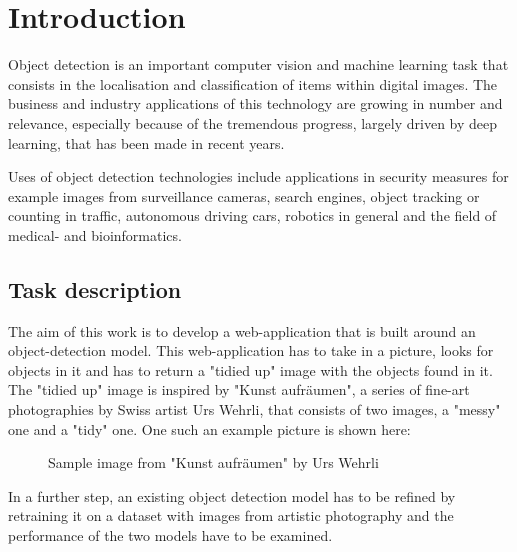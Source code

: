 \chapter{Introduction}
\label{Introduction}
Object detection is an important computer vision and machine learning task that consists in the localisation and classification of items within digital images. The business and industry applications of this technology are growing in number and relevance, especially because of the tremendous progress, largely driven by deep learning, that has been made in recent years.

Uses of object detection technologies include applications in security measures for example images from surveillance cameras, search engines, object tracking or counting in traffic, autonomous driving cars, robotics in general and the field of medical- and bioinformatics.

\section{Task description}
The aim of this work is to develop a web-application that is built around an object-detection model. This web-application has to take in a picture, looks for objects in it and has to return a "tidied up" image with the objects found in it. The "tidied up" image is inspired by "Kunst aufräumen", a series of fine-art photographies by Swiss artist Urs Wehrli, that consists of two images, a "messy" one and a "tidy" one. One such an example picture is shown here:

\begin{figure}[H]
	\caption{\label{fig:kunst-aufraeumen-sample} Sample image from "Kunst aufräumen" by Urs Wehrli}
\end{figure}

In a further step, an existing object detection model has to be refined by retraining it on a dataset with images from artistic photography and the performance of the two models have to be examined.

